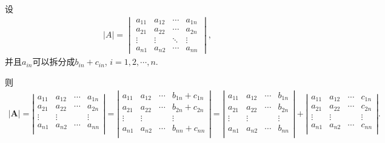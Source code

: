 \documentclass[lang=cn,newtx,10pt,scheme=chinese]{elegantbook}
\begin{document}
\begin{proposition}\label{小拆分法}
    设
    \begin{align*}
        |A| = 
    \begin{vmatrix}
    a_{11} & a_{12} & \cdots & a_{1n} \\
    a_{21} & a_{22} & \cdots & a_{2n} \\
    \vdots & \vdots & \ddots & \vdots \\
    a_{n1} & a_{n2} & \cdots & a_{nn}
    \end{vmatrix},
    \nonumber
    \end{align*}
    并且$a_{in}$可以拆分成$b_{in}+c_{in}$,$\,\,i=1,2,\cdots,n.$

    则
    \begin{align*}
        \left| \boldsymbol{A} \right|=\left| \begin{matrix}
            a_{11}&		a_{12}&		\cdots&		a_{1n}\\
            a_{21}&		a_{22}&		\cdots&		a_{2n}\\
            \vdots&		\vdots&		&		\vdots\\
            a_{n1}&		a_{n2}&		\cdots&		a_{nn}\\
        \end{matrix} \right|=\left| \begin{matrix}
            a_{11}&		a_{12}&		\cdots&		b_{1n}+c_{1n}\\
            a_{21}&		a_{22}&		\cdots&		b_{2n}+c_{2n}\\
            \vdots&		\vdots&		&		\vdots\\
            a_{n1}&		a_{n2}&		\cdots&		b_{nn}+c_{nn}\\
        \end{matrix} \right|=\left| \begin{matrix}
            a_{11}&		a_{12}&		\cdots&		b_{1n}\\
            a_{21}&		a_{22}&		\cdots&		b_{2n}\\
            \vdots&		\vdots&		&		\vdots\\
            a_{n1}&		a_{n2}&		\cdots&		b_{nn}\\
        \end{matrix} \right|+\left| \begin{matrix}
            a_{11}&		a_{12}&		\cdots&		c_{1n}\\
            a_{21}&		a_{22}&		\cdots&		c_{2n}\\
            \vdots&		\vdots&		&		\vdots\\
            a_{n1}&		a_{n2}&		\cdots&		c_{nn}\\
        \end{matrix} \right|.
    \end{align*}
\end{proposition}
\end{document}
